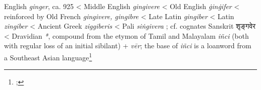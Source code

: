 \begin{etymology}\label{ety:ginger}
English \textit{ginger}, ca. 925
< Middle English \textit{gingivere}
< Old English \textit{ġinġifer}
< reinforced by Old French \textit{gingivere, gingibre }
< Late Latin \textit{gingiber}
< Latin \textit{zingiber}
< Ancient Greek {} \textit{ziggiberis}
< Pali \textit{siṅgivera }; cf. cognates Sanskrit शृङ्गवेर 
< Dravidian \textit{*}, compound  from the etymon of Tamil and Malayalam \textit{iñci} (both with regular loss of an initial sibilant) + \textit{vēr}; the base of  \textit{iñci} is a loanword from a Southeast Asian language\footnote{\textcite{oed; ross_ginger_1952}; }
\end{etymology}